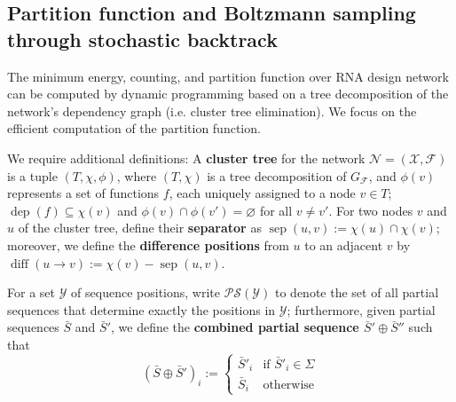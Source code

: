\documentclass{bioinfo}
\newcommand{\network}{\mathcal{N}}
\newcommand{\val}{\bar S} %
\newcommand{\dep}{\operatorname{dep}}
\newcommand{\energy}[1]{\operatorname{e}_{#1}}
\newcommand{\numberof}{\operatorname{\#}}
\newcommand{\partfun}[1]{Z_{#1}}
\newcommand{\separator}[2]{\operatorname{sep}(#1,#2)}
\newcommand{\difference}[2]{\operatorname{diff}(#1 \rightarrow #2)}
\newcommand{\partseqs}{\mathcal{P\!S}}
\newcommand{\F}{\mathcal{F}}
\newcommand{\X}{\mathcal{X}}
\newcommand{\Y}{\mathcal{Y}}
\newcommand{\Def}[1]{{\bfseries #1}}
\newcommand{\evalfor}[2]{#1\llbracket{}#2\rrbracket{}}
\newcommand{\substitute}[2]{#1\!\oplus\!#2}
\begin{document}


\subsection{Partition function and Boltzmann sampling through stochastic backtrack}\label{sec:PF}
The minimum energy, counting, and partition function
over RNA design network can be computed by dynamic programming based
on a tree decomposition of the network's dependency graph
(i.e. cluster tree elimination).
We focus on the efficient computation of the partition
function. %

%

We require additional definitions: A \Def{cluster tree} for the
network $\network=(\X,\F)$ is a tuple $(T,\chi,\phi)$, where
$(T,\chi)$ is a tree decomposition of $G_\F$, and $\phi(v)$ represents
a set of functions $f$, each uniquely assigned to a node $v\in T$;
$\dep(f)\subseteq\chi(v)$ and $\phi(v)\cap \phi(v')=\varnothing$ for
all $v\neq v'$.  For two nodes $v$ and $u$ of the cluster tree, define
their \Def{separator} as $\separator{u}{v} := \chi(u)\cap\chi(v)$;
moreover, we define the \Def{difference positions} from $u$ to an
adjacent $v$ by $\difference{u}{v}:=\chi(v) - \separator{u}{v}$.

For a set $\Y$ of sequence positions, write $\partseqs(\Y)$ to
denote the set of all partial sequences that determine exactly the positions
in $\Y$; furthermore, given partial sequences $\val$ and
$\val'$, we define the \Def{combined partial sequence $\substitute{\val'}{\val''}$} such that
$$
(\substitute{\val}{\val'})_i :=
\begin{cases}
  \val'_i & \text{if } \val'_i\in \Sigma\\
  \val_i & \text{otherwise}
\end{cases}
$$
\end{document}
